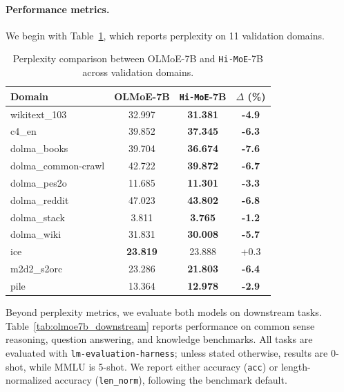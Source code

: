 \documentclass[sigconf,nonacm]{acmart}
\begin{document}
\paragraph{Performance metrics.}
We begin with Table~\ref{tab:olmoe7b_perplexity}, which reports perplexity on 11 validation domains.
\begin{table}[!htbp]
\centering
\caption{Perplexity comparison between OLMoE-7B and \texttt{Hi-MoE}-7B across validation domains.}
\label{tab:olmoe7b_perplexity}
\setlength{\tabcolsep}{4pt}
\begin{tabular}{lccc}
\toprule
\textbf{Domain} & \textbf{OLMoE-7B} & \textbf{\texttt{Hi-MoE}-7B} & \textbf{$\Delta$ (\%)} \\
\midrule
wikitext\_103           & 32.997 & \textbf{31.381} & \textbf{-4.9} \\
c4\_en                  & 39.852 & \textbf{37.345} & \textbf{-6.3} \\
dolma\_books            & 39.704 & \textbf{36.674} & \textbf{-7.6} \\
dolma\_common-crawl     & 42.722 & \textbf{39.872} & \textbf{-6.7} \\
dolma\_pes2o            & 11.685 & \textbf{11.301} & \textbf{-3.3} \\
dolma\_reddit           & 47.023 & \textbf{43.802} & \textbf{-6.8} \\
dolma\_stack            & 3.811  & \textbf{3.765}  & \textbf{-1.2} \\
dolma\_wiki             & 31.831 & \textbf{30.008} & \textbf{-5.7} \\
ice                     & \textbf{23.819} & 23.888 & +0.3 \\
m2d2\_s2orc             & 23.286 & \textbf{21.803} & \textbf{-6.4} \\
pile                    & 13.364 & \textbf{12.978} & \textbf{-2.9} \\
\bottomrule
\end{tabular}
\end{table}


Beyond perplexity metrics, we evaluate both models on downstream tasks. Table~\ref{tab:olmoe7b_downstream} reports performance on common sense reasoning, question answering, and knowledge benchmarks. All tasks are evaluated with \texttt{lm-evaluation-harness}; unless stated otherwise, results are 0-shot, while MMLU is 5-shot. We report either accuracy (\texttt{acc}) or length-normalized accuracy (\texttt{len\_norm}), following the benchmark default.
\end{document}
